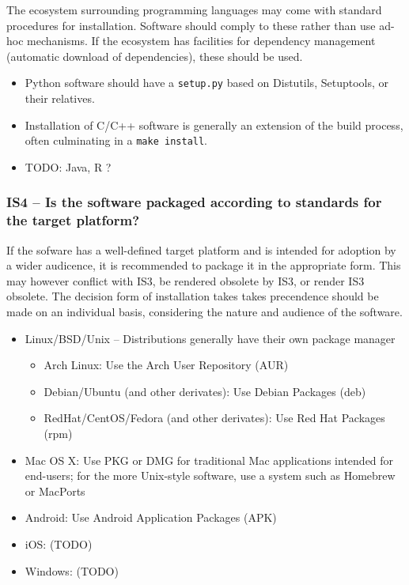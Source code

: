 \documentclass[a4paper,11pt]{article}
\begin{document}
The ecosystem surrounding programming languages may come with standard
procedures for installation. Software should comply to these rather than use
ad-hoc mechanisms. If the ecosystem has facilities for dependency management
(automatic download of dependencies), these should be used.

\begin{itemize}
 \item Python software should have a \texttt{setup.py} based on Distutils,
     Setuptools, or their relatives.
 \item Installation of C/C++ software is generally an extension of the build
     process, often culminating in a \texttt{make install}.
 \item TODO: Java, R ?
\end{itemize}

\subsubsection{IS4 -- Is the software packaged according to standards for the target platform?}

If the sofware has a well-defined target platform and is intended for adoption
by a wider audicence, it is recommended to package it in the appropriate form.
This may however conflict with IS3, be rendered obsolete by IS3, or render IS3
obsolete. The decision form of installation takes takes precendence should be
made on an individual basis, considering the nature and audience of the
software.

\begin{itemize}
    \item Linux/BSD/Unix -- Distributions generally have their own package manager
    \begin{itemize}
        \item Arch Linux: Use the Arch User Repository (AUR)
        \item Debian/Ubuntu (and other derivates): Use Debian Packages (deb)
        \item RedHat/CentOS/Fedora (and other derivates): Use Red Hat Packages (rpm)
    \end{itemize}
    \item Mac OS X: Use PKG or DMG for traditional Mac applications intended for end-users; for the more Unix-style
        software, use a system such as Homebrew or MacPorts
    \item Android: Use Android Application Packages (APK)
    \item iOS: (TODO) 
    \item Windows: (TODO) 
\end{itemize}
\end{document}
